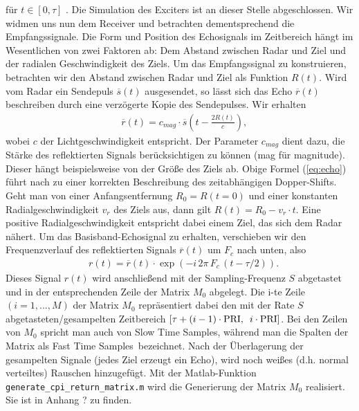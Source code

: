 %
für $ t \in [0, \tau] $ . Die Simulation des Exciters ist an dieser Stelle abgeschlossen. Wir widmen uns nun dem Receiver und betrachten dementsprechend die Empfangssignale. Die Form und Position des Echosignals im Zeitbereich hängt im Wesentlichen von zwei Faktoren ab: Dem Abstand zwischen Radar und Ziel und der radialen Geschwindigkeit des Ziels. Um das Empfangssignal zu konstruieren, betrachten wir den Abstand zwischen Radar und Ziel als Funktion $ R(t) $. Wird vom Radar ein Sendepuls $ \overline{s}(t) $ ausgesendet, so lässt sich das Echo $ \overline{r}(t) $ beschreiben durch eine verzögerte Kopie des Sendepulses. Wir erhalten 
%
\begin{eqnarray}
& \overline{r}(t) = c_{mag} \cdot \overline{s}(t - \frac{2 R(t)}{c}) \text{,}
\label{eq:echo}
\end{eqnarray}
%
wobei $ c $ der Lichtgeschwindigkeit entspricht. Der Parameter $ c_{mag} $ dient dazu, die Stärke des reflektierten Signals berücksichtigen zu können (mag für \glqq magnitude\grqq). Dieser hängt beispielsweise von der Größe des Ziels ab. Obige Formel (\ref{eq:echo}) führt nach \cite[Seite 95]{Richards} zu einer korrekten Beschreibung des zeitabhängigen Dopper-Shifts. Geht man von einer Anfangsentfernung $ R_0 = R(t=0) $ und einer konstanten Radialgeschwindigkeit $ v_{r} $ des Ziels aus, dann gilt $ R(t) = R_0 - v_r\cdot t $. Eine positive Radialgeschwindigkeit entspricht dabei einem Ziel, das sich dem Radar nähert. Um das Basisband-Echosignal zu erhalten, verschieben wir den Frequenzverlauf des reflektierten Signals $ \overline{r}(t) $ um $ F_c $ nach unten, also
%
\begin{eqnarray}
& r(t) = \overline{r}(t)\cdot \exp\left(- i \, 2 \pi \, F_{c} \, (t - \tau/2) \right) \text{.}
\end{eqnarray}
%
Dieses Signal $ r(t) $ wird anschließend mit der Sampling-Frequenz  $ S $ abgetastet und in der entsprechenden Zeile der Matrix $ M_0 $ abgelegt. Die i-te Zeile $ (i = 1,...,M) $ der Matrix $ M_0 $ repräsentiert dabei den mit der Rate $ S $ abgetasteten/gesampelten Zeitbereich $ [\tau + (i-1)\cdot \text{PRI}, \enskip i\cdot \text{PRI}] $. Bei den Zeilen von $ M_0 $ spricht man auch von \glqq Slow Time Samples\grqq , während man die Spalten der Matrix als \glqq Fast Time Samples\grqq ~bezeichnet. Nach der Überlagerung der gesampelten Signale (jedes Ziel erzeugt ein Echo), wird noch weißes (d.h. normal verteiltes) Rauschen hinzugefügt. Mit der Matlab-Funktion \texttt{generate\_{}cpi\_{}return\_{}matrix.m} wird die Generierung der Matrix $ M_0 $ realisiert. Sie ist in Anhang ? zu finden.

